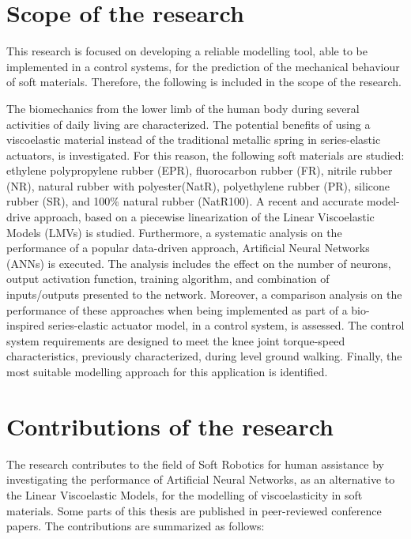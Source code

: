 \section{Scope of the research}

This research is focused on developing a reliable modelling tool, able to be implemented in a control systems, for the prediction of the mechanical behaviour of soft materials. Therefore, the following is included in the scope of the research. 

The biomechanics from the lower limb of the human body during several activities of daily living are characterized. The potential benefits of using a viscoelastic material instead of the traditional metallic spring in series-elastic actuators, is investigated. For this reason, the following soft materials are studied: ethylene polypropylene rubber (EPR), fluorocarbon rubber (FR), nitrile rubber (NR), natural rubber with polyester(NatR),  polyethylene  rubber  (PR),  silicone  rubber  (SR), and  100\% natural rubber (NatR100). A recent and accurate model-drive approach, based on a piecewise linearization of the Linear Viscoelastic Models (LMVs) is studied. Furthermore, a systematic analysis on the performance of a popular data-driven approach, Artificial Neural Networks (ANNs) is executed. The analysis includes the effect on the number of neurons, output activation function, training algorithm, and combination of inputs/outputs presented to the network. Moreover, a comparison analysis on the performance of these approaches when being implemented as part of a bio-inspired series-elastic actuator model, in a control system, is assessed. The control system requirements are designed to meet the knee joint torque-speed characteristics, previously characterized, during level ground walking. Finally, the most suitable modelling approach for this application is identified.

\section{Contributions of the research}

The research contributes to the field of Soft Robotics for human assistance by investigating the performance of Artificial Neural Networks, as an alternative to the Linear Viscoelastic Models, for the modelling of viscoelasticity in soft materials. Some parts of this thesis are published in peer-reviewed conference papers. The contributions are summarized as follows:

